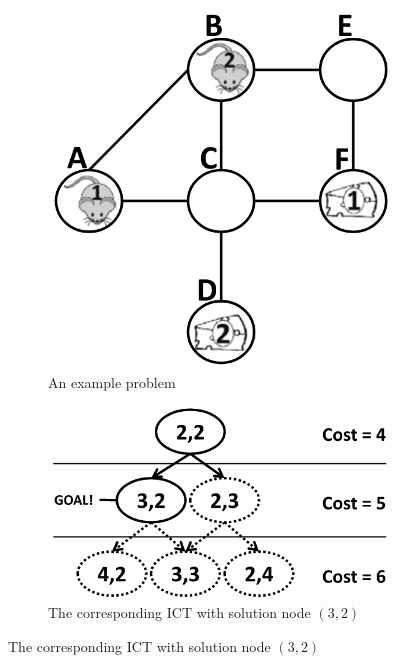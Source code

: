 \documentclass[english,10pt]{article}
\begin{document}
	
	\begin{figure}[b]
		\centering
		\begin{subfigure}{0.2\textwidth}
			\centering
			\includegraphics[width=\linewidth]{img/mdds1}
			\caption{An example problem}
			\label{fig:problem}
		\end{subfigure}
		\hfill
		\begin{subfigure}{0.3\textwidth}
			\centering
			\includegraphics[width=\linewidth]{img/ict2}
			\caption{The corresponding ICT with solution node $(3,2)$}
			\label{fig:ict2}
		\end{subfigure}
		\hfill

\end{figure}
\end{document}
